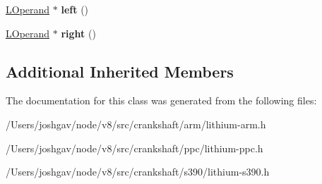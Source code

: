 \begin{DoxyCompactItemize}
\item 
\hyperlink{classv8_1_1internal_1_1_l_operand}{L\+Operand} $\ast$ {\bfseries left} ()\hypertarget{classv8_1_1internal_1_1_l_r_sub_i_ad9288bfe8084d498ffe4d7a351cdb66c}{}\label{classv8_1_1internal_1_1_l_r_sub_i_ad9288bfe8084d498ffe4d7a351cdb66c}

\item 
\hyperlink{classv8_1_1internal_1_1_l_operand}{L\+Operand} $\ast$ {\bfseries right} ()\hypertarget{classv8_1_1internal_1_1_l_r_sub_i_abf46e449517b11632b54ea54f2f44a77}{}\label{classv8_1_1internal_1_1_l_r_sub_i_abf46e449517b11632b54ea54f2f44a77}

\end{DoxyCompactItemize}
\subsection*{Additional Inherited Members}


The documentation for this class was generated from the following files\+:\begin{DoxyCompactItemize}
\item 
/\+Users/joshgav/node/v8/src/crankshaft/arm/lithium-\/arm.\+h\item 
/\+Users/joshgav/node/v8/src/crankshaft/ppc/lithium-\/ppc.\+h\item 
/\+Users/joshgav/node/v8/src/crankshaft/s390/lithium-\/s390.\+h\end{DoxyCompactItemize}
